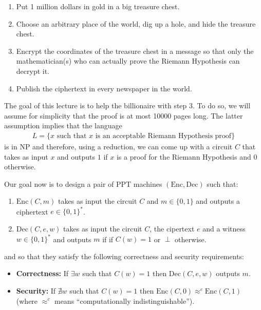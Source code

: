 \documentclass[12pt]{tufte-book}
\begin{document}
\begin{enumerate}

\item Put 1 million dollars in gold in a big treasure chest.

\item Choose an arbitrary place of the world, dig up a hole, and hide the treasure chest.

\item Encrypt the coordinates of the treasure chest in a message so that only the mathematician(s) who can actually prove the Riemann Hypothesis can decrypt it.

\item Publish the ciphertext in every newspaper in the world.

\end{enumerate}

The goal of this lecture is to help the billionaire with step 3. To do so, we will assume for simplicity  that the proof is at most 10000 pages long. The latter assumption implies that the language
\begin{align*}
L = \{ x \text{ such that } x \text{ is an acceptable Riemann Hypothesis proof} \}
\end{align*}
 is in NP and therefore, using a reduction, we can come up with a circuit $C$ that takes as input $x$ and outputs $1$ if $x$ is a proof for the Riemann Hypothesis and $0$ otherwise.

\smallskip
Our goal now is to  design a pair of PPT machines $(\mathrm{Enc},\mathrm{Dec})$ such that:

\begin{enumerate}
\item $\mathrm{Enc}(C,m)$ takes as input the circuit $C$ and $m \in \{0,1\}$ and outputs a ciphertext $e \in \{0,1\}^{*}$.

\item $\mathrm{Dec}(C,e,w)$ takes as input the circuit $C$, the cipertext $e$ and a witness $w \in \{0,1\}^{*}$ and outputs $m$ if if $C(w) = 1$ or $\perp$ otherwise.
\end{enumerate}

and so that they satisfy the following correctness and security requirements:

\begin{itemize}

\item \textbf{Correctness:} If $\exists w$ such that $C(w) = 1$ then $\mathrm{Dec}(C,e,w)$ outputs $m$.

\item \textbf{Security:} If $\nexists w$ such that $C(w) = 1$ then $\mathrm{Enc}(C,0)   \approx^{c} \mathrm{Enc}(C,1) \!\ $ (where $ \approx^{c}$ means  ``computationally indistinguishable'').

\end{itemize}
\end{document}
